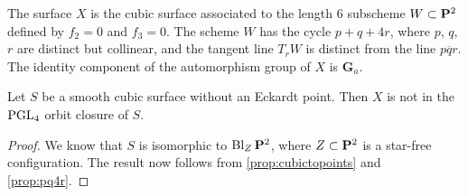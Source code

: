 \documentclass[12pt,reqno]{amsart}
\DeclareMathOperator{\Bl}{Bl}
\numberwithin{equation}{section}
\newcommand{\G}{\mathbf G}
\begin{document}
The surface $X$ is the cubic surface associated to the length 6 subscheme $W \subset \P^2$ defined by $f_2 = 0$ and $f_3 = 0$.
The scheme $W$ has the cycle $p + q + 4r$, where $p$, $q$, $r$ are distinct but collinear, and the tangent line $T_rW$ is distinct from the line $\overline{pqr}$.
The identity component of the automorphism group of $X$ is $\G_a$.
\begin{proposition}
  Let $S$ be a smooth cubic surface without an Eckardt point.
  Then $X$ is not in the $\PGL_4$ orbit closure of $S$.
\end{proposition}
\begin{proof}
  We know that $S$ is isomorphic to $\Bl_Z \P^2$, where $Z \subset \P^2$ is a star-free configuration.
  The result now follows from \autoref{prop:cubictopoints} and \autoref{prop:pq4r}.
\end{proof}



\end{document}
